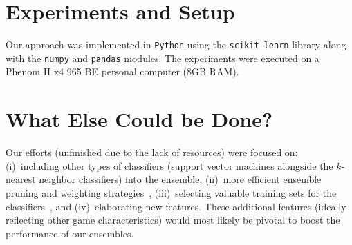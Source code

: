 \documentclass{svproc}
\begin{document}
\section{Experiments and Setup}

Our approach was implemented in \texttt{Python} using the \texttt{scikit-learn} library along with the \texttt{numpy} and \texttt{pandas} modules. The experiments were executed on a Phenom II x4 965 BE personal computer (8GB RAM).

\section{What Else Could be Done?}

Our efforts (unfinished due to the lack of resources) were focused on: (i)~including other types of classifiers (support vector machines alongside the $k$-nearest neighbor classifiers) into the ensemble, (ii)~more efficient ensemble pruning and weighting strategies~\cite{Krawczyk2015490}, (iii)~selecting valuable training sets for the classifiers~\cite{Nalepa2016113}, and (iv)~elaborating new features. These additional features (ideally reflecting other game characteristics) would most likely be pivotal to boost the performance of our ensembles.





\end{document}
